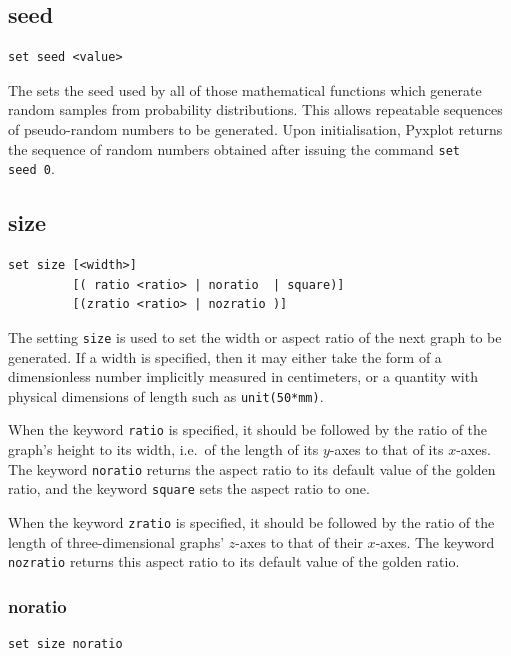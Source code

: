 \subsection{seed}

\begin{verbatim}
set seed <value>
\end{verbatim}

The  sets the seed used by all of those mathematical
functions which generate random samples from probability distributions.  This
allows repeatable sequences of pseudo-random numbers to be generated.  Upon
initialisation, Pyxplot returns the sequence of random numbers obtained after
issuing the command {\tt set seed~0}.


\subsection{size}

\begin{verbatim}
set size [<width>]
         [( ratio <ratio> | noratio  | square)]
         [(zratio <ratio> | nozratio )]
\end{verbatim}

The setting {\tt size} is used to set the width or aspect ratio of the next
graph to be generated. If a width is specified, then it may either take the
form of a dimensionless number implicitly measured in centimeters, or a
quantity with physical dimensions of length such as {\tt unit(50*mm)}.

When the keyword {\tt ratio} is specified, it should be followed by the ratio
of the graph's height to its width, i.e.\ of the length of its $y$-axes to that
of its $x$-axes. The keyword {\tt noratio} returns the aspect ratio to its
default value of the golden ratio, and the keyword {\tt square} sets the aspect
ratio to one.

When the keyword {\tt zratio} is specified, it should be followed by the ratio
of the length of three-dimensional graphs' $z$-axes to that of their $x$-axes.
The keyword {\tt nozratio} returns this aspect ratio to its default value of
the golden ratio.


\subsubsection{noratio}

\begin{verbatim}
set size noratio
\end{verbatim}

